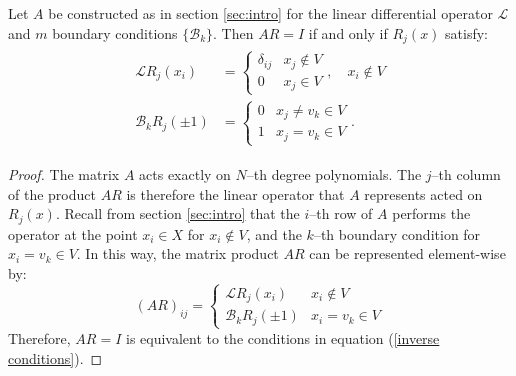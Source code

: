 \documentclass{article}
\begin{document}
\begin{lemma}
Let $A$ be constructed as in section \ref{sec:intro} for the linear differential operator $\mathcal{L}$ and $m$ boundary conditions $\{ \mathcal{B}_k \}$.
Then $AR = I$ if and only if $R_j(x)$ satisfy:
\begin{align} 
\begin{split} \label{inverse conditions}
\mathcal{L} R_j(x_i) & = \begin{cases} \delta_{ij} & x_j \notin V \\ 0 & x_j \in V \end{cases}, \quad x_i \notin V \\
\mathcal{B}_k R_j(\pm 1) & = \begin{cases} 0 & x_j \neq v_k \in V \\ 1 & x_j = v_k \in V \end{cases} .
\end{split}
\end{align}
\end{lemma}

\begin{proof}
The matrix $A$ acts exactly on $N$--th degree polynomials.
The $j$--th column of the product $A R$ is therefore the linear operator that $A$ represents acted on $R_j(x)$.
Recall from section \ref{sec:intro} that the $i$--th row of $A$ performs the operator at the point $x_i \in X$
for $x_i \notin V$, and the $k$--th boundary condition for $x_i = v_k \in V$.
In this way, the matrix product $A R$ can be represented element-wise by:
\begin{equation}
(A R)_{ij} = \begin{cases} \mathcal{L} R_j(x_i) & x_i \notin V \\ \mathcal{B}_k R_j(\pm 1) & x_i = v_k \in V \end{cases}
\end{equation}
Therefore, $A R = I$ is equivalent to the conditions in equation (\ref{inverse conditions}).
\end{proof}

\end{document}
